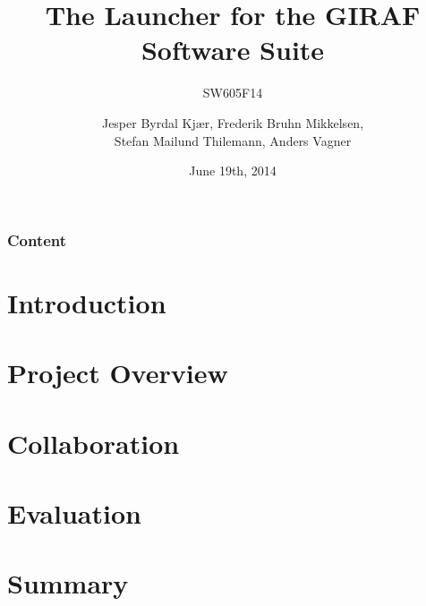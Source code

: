 \documentclass{beamer}
\title[The Launcher for the GIRAF Software Suite]{The Launcher for the GIRAF Software Suite}
\subtitle{SW605F14}
\author[SW605F14]{Jesper Byrdal Kj\ae r, Frederik Bruhn Mikkelsen, \\Stefan Mailund Thilemann, Anders Vagner}
\institute[Aalborg University]
{
  Department of Computer Science\\
  Aalborg University}
\date[CFP 2003]{June 19th, 2014}
\begin{document}
\begin{frame}
  \titlepage
\end{frame}

\begin{frame}
    \frametitle{Content}
    \tableofcontents[sectionstyle=show/show,subsectionstyle=hide/hide/hide]
\end{frame}

\section{Introduction}


\section{Project Overview}


\section{Collaboration}


\section{Evaluation}


\section{Summary}

\end{document}
